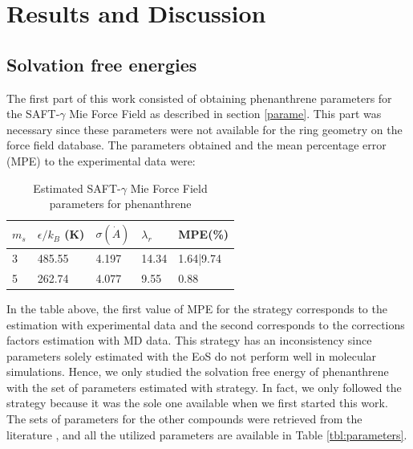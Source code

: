 \chapter{Results and Discussion} %

\label{Chapter5} %

\section{Solvation free energies}

The first part of this work consisted of obtaining phenanthrene parameters for the SAFT-$\gamma$ Mie Force Field as described in section \ref{parame}. This part was necessary since these parameters were not available for the ring geometry on the force field database. The parameters obtained and the mean percentage error (MPE) to the experimental data \cite{pvphen} were:

\begin{table}[h]
    \centering
    \caption{Estimated SAFT-$\gamma$ Mie Force Field parameters for phenanthrene}
    \label{tbl:estimparameters}
    \begin{tabular}{lllll}
        \hline
         $m_s$ & $\epsilon/k_{B}$ (K) & $\sigma (\dot{A})$ & $\lambda_r$& MPE(\%) \\ \hline
         3 \cite{lafitte2012}    & 485.55              & 4.197              & 14.34 & 1.64|9.74       \\ 
         5  \cite{muller2017}   & 262.74               & 4.077              & 9.55   &  0.88   \\ \hline
    \end{tabular}
    
\end{table} 

In the table above, the first value of MPE for the  strategy corresponds to the estimation with experimental data and the second corresponds to the corrections factors estimation with MD data. This strategy has an inconsistency since parameters solely estimated with the EoS do not perform well in molecular simulations. Hence, we only studied the solvation free energy of phenanthrene with the set of parameters estimated with  strategy. In fact, we only followed the \cite{lafitte2012} strategy because it was the sole one available when we first started this work. The sets of parameters for the other compounds were retrieved from the literature \cite{lobanova2016,herdes2015,ervik2016,muller2017}, and all the utilized parameters are available in Table \ref{tbl:parameters}.

